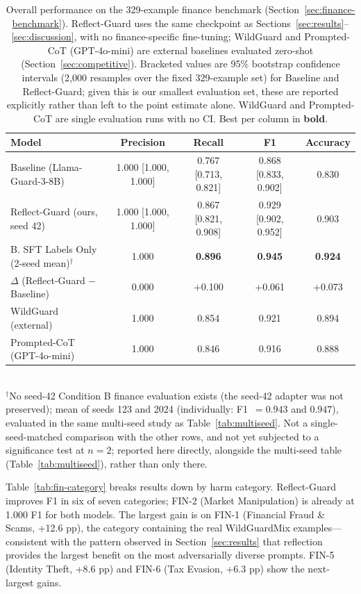 \documentclass[superintelligence,article,submit,pdftex,moreauthors]{Definitions/mdpi}
\begin{document}
\begin{table}[H]
\caption{Overall performance on the 329-example finance benchmark (Section~\ref{sec:finance-benchmark}). Reflect-Guard uses the same checkpoint as Sections~\ref{sec:results}--\ref{sec:discussion}, with no finance-specific fine-tuning; WildGuard and Prompted-CoT (GPT-4o-mini) are external baselines evaluated zero-shot (Section~\ref{sec:competitive}). Bracketed values are 95\% bootstrap confidence intervals (2{,}000 resamples over the fixed 329-example set) for Baseline and Reflect-Guard; given this is our smallest evaluation set, these are reported explicitly rather than left to the point estimate alone. WildGuard and Prompted-CoT are single evaluation runs with no CI. Best per column in \textbf{bold}.}
\label{tab:fin-overall}
\centering
\small
\begin{tabular}{lcccc}
\toprule
\textbf{Model} & \textbf{Precision} & \textbf{Recall} & \textbf{F1} & \textbf{Accuracy} \\
\midrule
Baseline (Llama-Guard-3-8B) & 1.000 [1.000, 1.000] & 0.767 [0.713, 0.821] & 0.868 [0.833, 0.902] & 0.830 \\
Reflect-Guard (ours, seed 42) & 1.000 [1.000, 1.000] & 0.867 [0.821, 0.908] & 0.929 [0.902, 0.952] & 0.903 \\
B. SFT Labels Only (2-seed mean)$^\dagger$ & 1.000 & \textbf{0.896} & \textbf{0.945} & \textbf{0.924} \\
\midrule
$\Delta$ (Reflect-Guard $-$ Baseline) & 0.000 & +0.100 & +0.061 & +0.073 \\
\midrule
WildGuard (external)        & 1.000 & 0.854 & 0.921 & 0.894 \\
Prompted-CoT (GPT-4o-mini)  & 1.000 & 0.846 & 0.916 & 0.888 \\
\bottomrule
\end{tabular}
\\[2pt]
{\footnotesize $^\dagger$No seed-42 Condition B finance evaluation exists (the seed-42 adapter was not preserved); mean of seeds 123 and 2024 (individually: F1~$=0.943$ and $0.947$), evaluated in the same multi-seed study as Table~\ref{tab:multiseed}. Not a single-seed-matched comparison with the other rows, and not yet subjected to a significance test at $n=2$; reported here directly, alongside the multi-seed table (Table~\ref{tab:multiseed}), rather than only there.}
\end{table}

Table~\ref{tab:fin-category} breaks results down by harm category. Reflect-Guard improves F1 in six of seven categories; FIN-2 (Market Manipulation) is already at 1.000 F1 for both models. The largest gain is on FIN-1 (Financial Fraud \& Scams, +12.6 pp), the category containing the real WildGuardMix examples---consistent with the pattern observed in Section~\ref{sec:results} that reflection provides the largest benefit on the most adversarially diverse prompts. FIN-5 (Identity Theft, +8.6 pp) and FIN-6 (Tax Evasion, +6.3 pp) show the next-largest gains.
\end{document}
